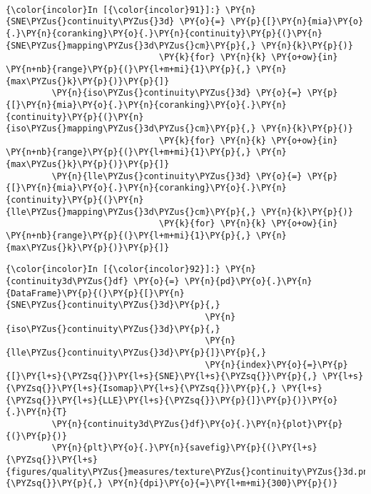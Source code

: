     \begin{center}
    \end{center}
    { \hspace*{\fill} \\}

    \begin{Verbatim}[commandchars=\\\{\}]
{\color{incolor}In [{\color{incolor}91}]:} \PY{n}{SNE\PYZus{}continuity\PYZus{}3d} \PY{o}{=} \PY{p}{[}\PY{n}{mia}\PY{o}{.}\PY{n}{coranking}\PY{o}{.}\PY{n}{continuity}\PY{p}{(}\PY{n}{SNE\PYZus{}mapping\PYZus{}3d\PYZus{}cm}\PY{p}{,} \PY{n}{k}\PY{p}{)}
                              \PY{k}{for} \PY{n}{k} \PY{o+ow}{in} \PY{n+nb}{range}\PY{p}{(}\PY{l+m+mi}{1}\PY{p}{,} \PY{n}{max\PYZus{}k}\PY{p}{)}\PY{p}{]}
         \PY{n}{iso\PYZus{}continuity\PYZus{}3d} \PY{o}{=} \PY{p}{[}\PY{n}{mia}\PY{o}{.}\PY{n}{coranking}\PY{o}{.}\PY{n}{continuity}\PY{p}{(}\PY{n}{iso\PYZus{}mapping\PYZus{}3d\PYZus{}cm}\PY{p}{,} \PY{n}{k}\PY{p}{)}
                              \PY{k}{for} \PY{n}{k} \PY{o+ow}{in} \PY{n+nb}{range}\PY{p}{(}\PY{l+m+mi}{1}\PY{p}{,} \PY{n}{max\PYZus{}k}\PY{p}{)}\PY{p}{]}
         \PY{n}{lle\PYZus{}continuity\PYZus{}3d} \PY{o}{=} \PY{p}{[}\PY{n}{mia}\PY{o}{.}\PY{n}{coranking}\PY{o}{.}\PY{n}{continuity}\PY{p}{(}\PY{n}{lle\PYZus{}mapping\PYZus{}3d\PYZus{}cm}\PY{p}{,} \PY{n}{k}\PY{p}{)}
                              \PY{k}{for} \PY{n}{k} \PY{o+ow}{in} \PY{n+nb}{range}\PY{p}{(}\PY{l+m+mi}{1}\PY{p}{,} \PY{n}{max\PYZus{}k}\PY{p}{)}\PY{p}{]}
\end{Verbatim}

    \begin{Verbatim}[commandchars=\\\{\}]
{\color{incolor}In [{\color{incolor}92}]:} \PY{n}{continuity3d\PYZus{}df} \PY{o}{=} \PY{n}{pd}\PY{o}{.}\PY{n}{DataFrame}\PY{p}{(}\PY{p}{[}\PY{n}{SNE\PYZus{}continuity\PYZus{}3d}\PY{p}{,}
                                       \PY{n}{iso\PYZus{}continuity\PYZus{}3d}\PY{p}{,}
                                       \PY{n}{lle\PYZus{}continuity\PYZus{}3d}\PY{p}{]}\PY{p}{,}
                                       \PY{n}{index}\PY{o}{=}\PY{p}{[}\PY{l+s}{\PYZsq{}}\PY{l+s}{SNE}\PY{l+s}{\PYZsq{}}\PY{p}{,} \PY{l+s}{\PYZsq{}}\PY{l+s}{Isomap}\PY{l+s}{\PYZsq{}}\PY{p}{,} \PY{l+s}{\PYZsq{}}\PY{l+s}{LLE}\PY{l+s}{\PYZsq{}}\PY{p}{]}\PY{p}{)}\PY{o}{.}\PY{n}{T}
         \PY{n}{continuity3d\PYZus{}df}\PY{o}{.}\PY{n}{plot}\PY{p}{(}\PY{p}{)}
         \PY{n}{plt}\PY{o}{.}\PY{n}{savefig}\PY{p}{(}\PY{l+s}{\PYZsq{}}\PY{l+s}{figures/quality\PYZus{}measures/texture\PYZus{}continuity\PYZus{}3d.png}\PY{l+s}{\PYZsq{}}\PY{p}{,} \PY{n}{dpi}\PY{o}{=}\PY{l+m+mi}{300}\PY{p}{)}
\end{Verbatim}

